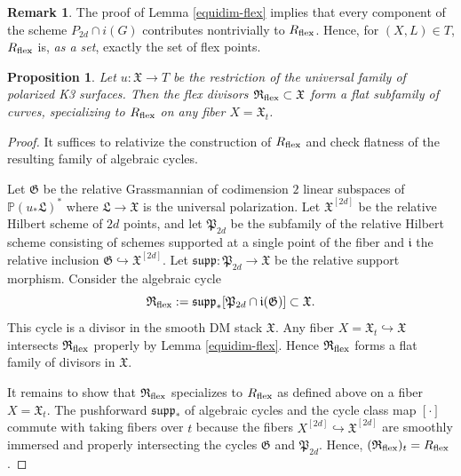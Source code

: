 \documentclass{amsart}
\newtheorem{proposition}[theorem]{Proposition}
\theoremstyle{definition}
\newtheorem{remark}[theorem]{Remark}
\begin{document}
\begin{remark}\label{points-flex} The proof of Lemma \ref{equidim-flex} implies that every
component of the scheme $P_{2d}\cap i(G)$
contributes nontrivially to $R_{\rm flex}$. Hence, for
$(X,L)\in T$, $R_{\rm flex}$ is, {\it as a set}, exactly
the set of flex points. \end{remark}

\begin{proposition} Let
$u\colon \mathfrak{X}\to T$ be the restriction of the universal family of polarized K3 surfaces.
Then the flex divisors $\mathfrak{R}_{\rm flex}\subset \mathfrak{X}$ form a flat
subfamily of curves, specializing to $R_{\rm flex}$ on any fiber $X=\mathfrak{X}_t$.
 \end{proposition}
 
 \begin{proof} It suffices to relativize the construction of $R_{\rm flex}$
 and check flatness of the resulting family of algebraic cycles.
 
  Let $\mathfrak{G}$ be the relative Grassmannian of codimension $2$
 linear subspaces of $\mathbb{P}(u_*\mathfrak{L})^*$ where $\mathfrak{L}\to \mathfrak{X}$
 is the universal polarization. Let $\mathfrak{X}^{[2d]}$ be the relative Hilbert scheme
 of $2d$ points, and let $\mathfrak{P}_{2d}$ be the subfamily of the relative Hilbert
 scheme consisting of schemes supported at a single point of the fiber and $\mathfrak{i}$
 the relative inclusion $\mathfrak{G}\hookrightarrow \mathfrak{X}^{[2d]}$. Let
 $\mathfrak{supp}:\mathfrak{P}_{2d}\to \mathfrak{X}$ be the relative support morphism.
 Consider the algebraic cycle
$$\mathfrak{R}_{\rm flex}:=
\mathfrak{supp}_*[\mathfrak{P}_{2d}\cap \mathfrak{i}(\mathfrak{G})]\subset \mathfrak{X}.$$
This cycle is a divisor in the smooth DM stack
$\mathfrak{X}$. Any fiber
 $X=\mathfrak{X}_t\hookrightarrow \mathfrak{X}$ intersects
 $\mathfrak{R}_{\rm flex}$ properly by Lemma \ref{equidim-flex}. Hence $\mathfrak{R}_{\rm flex}$
 forms a flat family of divisors in $\mathfrak{X}$.
 
 It remains to show that $\mathfrak{R}_{\rm flex}$
 specializes to $R_{\rm flex}$ as defined above on a fiber $X=\mathfrak{X}_t$. 
 The pushforward $\mathfrak{supp}_*$ of algebraic cycles and
 the cycle class map $[\cdot]$ commute
 with taking fibers over $t$ because the fibers $X^{[2d]}\hookrightarrow \mathfrak{X}^{[2d]}$
 are smoothly immersed and properly intersecting the cycles
 $\mathfrak{G}$ and $\mathfrak{P}_{2d}$.
 Hence,
 $(\mathfrak{R}_{\rm flex})_t=R_{\rm flex}$. \end{proof}
  
\end{document}
